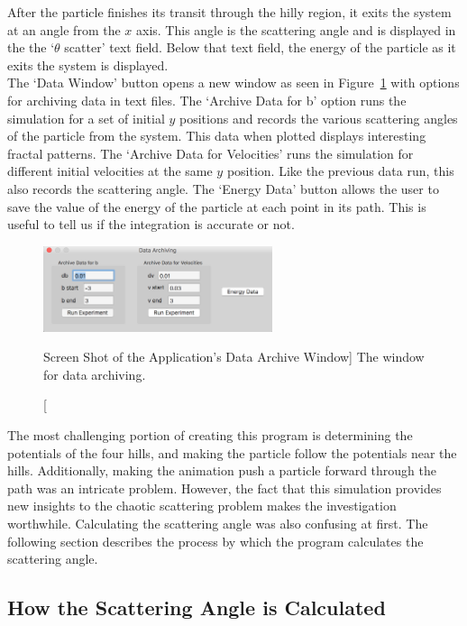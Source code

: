 \documentclass[12pt]{article} %
\begin{document}
After the particle finishes its transit through the hilly region, it exits the system at an angle from the $x$ axis. This angle is the scattering angle and is displayed in the the `$\theta$ scatter' text field. Below that text field, the energy of the particle as it exits the system is displayed. \\


The `Data Window' button opens a new window as seen in Figure~\ref{fig:DataArchivingWindow} with options for archiving data in text files. The `Archive Data for b' option runs the simulation for a set of initial $y$ positions and records the various scattering angles of the particle from the system. This data when plotted displays interesting fractal patterns. The `Archive Data for Velocities' runs the simulation for different initial velocities at the same $y$ position. Like the previous data run, this also records the scattering angle. The `Energy Data' button allows the user to save the value of the energy of the particle at each point in its path. This is useful to tell us if the integration is accurate or not.\\


\begin{figure}[h]
	\centering
	\includegraphics[width=0.6\textwidth]{dataWindow}
	\caption
	[Screen Shot of the Application's Data Archive Window]
	{The window for data archiving.}
	\label{fig:DataArchivingWindow}
\end{figure}


The most challenging portion of creating this program is determining the potentials of the four hills, and making the particle follow the potentials near the hills. Additionally, making the animation push a particle forward through the path was an intricate problem. However, the fact that this simulation provides new insights to the chaotic scattering problem makes the investigation worthwhile. Calculating the scattering angle was also confusing at first. The following section describes the process by which the program calculates the scattering angle. \\




\subsection{How the Scattering Angle is Calculated}
\end{document}
